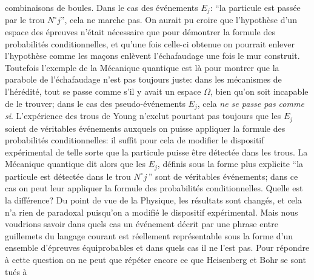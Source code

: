 combinaisons de boules. Dans le cas des \'ev\'enements $E_j$: ``la 
particule est  pass\'ee par le trou $N^\circ j$'', cela ne marche pas. On 
aurait pu croire que l'hypoth\`ese d'un espace des \'epreuves n'\'etait 
n\'ecessaire que pour d\'emontrer la formule des probabilit\'es 
conditionnelles, et qu'une fois celle-ci obtenue on pourrait enlever 
l'hypoth\`ese comme les ma\c{c}ons enl\`event l'\'echafaudage une fois  
le mur construit. Toutefois l'exemple de la M\'ecanique quantique est l\`a 
pour montrer que la parabole de l'\'echafaudage n'est pas toujours juste: 
dans les m\'ecanismes de l'h\'er\'edit\'e, tout se passe comme s'il y avait 
un espace $\Omega$, bien qu'on soit incapable de le trouver; dans le cas 
des pseudo-\'ev\'enements $E_j$, cela {\it ne se passe pas comme si}.  
\medskip 
L'exp\'erience des trous de Young n'exclut pourtant pas toujours que les 
$E_j$  soient de v\'eritables \'ev\'enements auxquels on puisse appliquer 
la formule des probabilit\'es conditionnelles: il suffit pour cela de 
modifier le dispositif exp\'erimental de telle sorte que la particule  
puisse \^etre d\'etect\'ee dans les trous. La M\'ecanique quantique dit 
alors que les $E_j$, d\'efinis sous la forme  plus explicite ``la particule 
est d\'etect\'ee dans le trou $N^\circ j\,$'' sont de v\'eritables 
\'ev\'enements; dans ce cas on peut leur appliquer  la  formule des 
probabilit\'es conditionnelles.  
\medskip 
Quelle est la diff\'erence? Du point de vue de la Physique, les  
r\'esultats sont chang\'es, et cela n'a rien de paradoxal puisqu'on a 
modifi\'e le dispositif exp\'erimental. Mais nous voudrions savoir dans 
quels cas un \'ev\'enement d\'ecrit par une phrase entre guillemets du 
langage courant est r\'eellement repr\'esentable sous la forme d'un 
ensemble d'\'epreuves \'equiprobables et dans quels cas il ne l'est pas.  
Pour r\'epondre \`a cette question on ne  peut que r\'ep\'eter encore ce 
que Heisenberg et Bohr se sont tu\'es \`a
